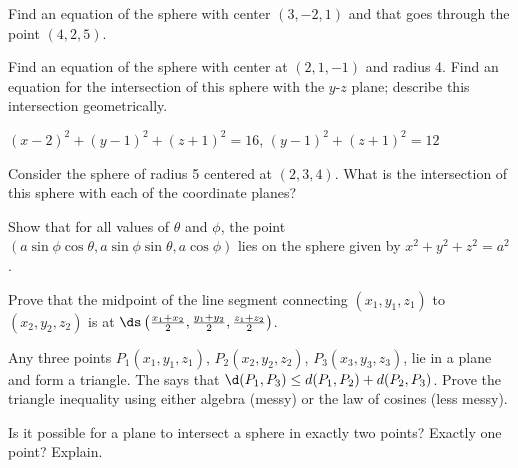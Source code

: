 \begin{enumialphparenastyle}
\begin{ex}
Find an equation of the sphere with center $(3,-2,1)$ and
that goes through the point $(4,2,5)$.
\end{ex}

\begin{ex}
Find an equation of the sphere with center at $(2,1,-1)$ and
radius 4. Find an equation for the intersection of this sphere with
the $y$-$z$ plane; describe this intersection geometrically.
\begin{sol}
$(x-2)^2+(y-1)^2+(z+1)^2=16$,
$(y-1)^2+(z+1)^2=12$
\end{sol}
\end{ex}

\begin{ex}
Consider the sphere of radius 5 centered at $(2,3,4)$.  What is
the intersection of this sphere with each of the coordinate planes?
\end{ex}

\begin{ex}
Show that for all values of $\theta$ and $\phi$, the point
$(a\sin\phi\cos\theta,a\sin\phi\sin\theta,a\cos\phi)$ lies on the
sphere given by $x^2+y^2+z^2=a^2$.
\end{ex}

\begin{ex}
Prove that the midpoint of the line segment connecting
$(x_1,y_1,z_1)$ to $(x_2,y_2,z_2)$ is at 
$\ds\left({x_1+x_2\over 2},{y_1+y_2\over 2},{z_1+z_2\over 2}\right)$.
\end{ex}

\begin{ex}
Any three points $P_1(x_1,y_1,z_1)$, $P_2(x_2,y_2,z_2)$,
$P_3(x_3,y_3,z_3)$, lie in a plane and form a triangle.  The 
says that $\d(P_1,P_3)\le d(P_1,P_2)+d(P_2,P_3)$.  Prove the triangle inequality
using either algebra (messy) or the law of cosines (less messy).
\end{ex}

\begin{ex}
Is it possible for a plane to intersect a sphere in exactly two
points?  Exactly one point? Explain.  
\end{ex}

\end{enumialphparenastyle}